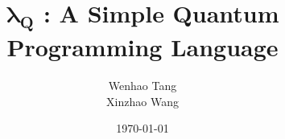 \documentclass[11pt]{article}
\title{$\bm{\lambda_Q}$ : A Simple Quantum Programming Language}
\author{
  Wenhao Tang\quad 1800013088
  \\[1ex]
  Xinzhao Wang\quad 1800013102
}
\affil{Department of EECS\\ Peking University}
\date{\today}
\begin{document}
\maketitle
\tableofcontents











\medskip


\end{document}
